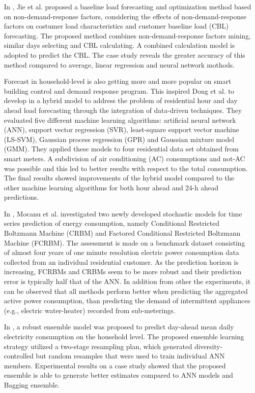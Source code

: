 In \cite{7576207}, Jie et al. proposed a baseline load forecasting and optimization method based on non-demand-response factors, considering the effects of non-demand-response factors on costumer load characteristics and customer baseline load (CBL) forecasting.
The proposed method combines non-demand-response factors mining, similar days selecting and CBL calculating.
A combined calculation model is adopted to predict the CBL.
The case study reveals the greater accuracy of this method compared to average, linear regression and neural network mothods.

Forecast in household-level is also getting more and more popular on smart building control and demand response program.
This inspired Dong et al. to develop in \cite{DONG2016341} a hybrid model to address the problem of residential hour and day ahead load forecasting through the integration of data-driven techniques.
They evaluated five different machine learning algorithms: artificial neural network (ANN), support vector regression (SVR), least-square support vector machine (LS-SVM), Gaussian process regression (GPR) and Gaussian mixture model (GMM).
They applied these models to four residential data set obtained from smart meters.
A subdivision of air conditioning (AC) consumptions and not-AC was possible and this led to better results with respect to the total consumption.
The final results showed improvements of the hybrid model compared to the other machine learning algorithms for both hour ahead and 24-h ahead predictions.

In \cite{MOCANU201691}, Mocanu et al. investigated two newly developed stochastic models for time series prediction of energy consumption, namely Conditional Restricted Boltzmann Machine (CRBM) and Factored Conditional Restricted Boltzmann Machine (FCRBM).
The assessment is made on a benchmark dataset consisting of almost four years of one minute resolution electric power consumption data collected from an individual residential customer.
As the prediction horizon is increasing, FCRBMs and CRBMs seem to be more robust and their prediction error is typically half that of the ANN.
In addition from other the experiments, it can be observed that all methods perform better when predicting the aggregated active power consumption, than predicting the demand of intermittent appliances (e.g., electric water-heater) recorded from sub-meterings.

In \cite{ALOBAIDI2018997}, a robust ensemble model was proposed to predict day-ahead mean daily electricity consumption on the household level.
The proposed ensemble learning strategy utilized a two-stage resampling plan, which generated diversity-controlled but random resamples that were used to train individual ANN members.
Experimental results on a case study showed that the proposed ensemble is able to generate better estimates compared to ANN models and Bagging ensemble.

